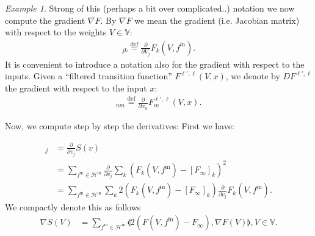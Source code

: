 \documentclass[10pt, a4paper]{article}
\theoremstyle{plain}
\theoremstyle{definition}
\theoremstyle{definition}
\theoremstyle{definition}
\theoremstyle{definition}
\theoremstyle{definition}
\theoremstyle{definition}
\theoremstyle{definition}
\theoremstyle{remark}
\theoremstyle{remark}
\newtheorem{example}[theorem]{Example}
\theoremstyle{rudin-style-generic}
\theoremstyle{rudin-style-generic*}
\theoremstyle{rudin-style-theorem}
\newcommand{\more}[1]{{{\noindent{}\hspace{-2cm}\color{red}{{$\blacktriangleright[[${{#1}}$]]$}}}}}
\newcommand{\deq}{\stackrel{\mathrm{def}}{=}}
\newcommand*{\fin}{{f^{\text{in}}}}
\begin{document}
\begin{example}
  Strong of this (perhaps a bit over complicated..) notation we now compute the gradient $\nabla F$.
  By $\nabla F$ we mean the gradient (i.e. Jacobian matrix) with respect to the weights $V\in\mathbb V$:
  \begin{align*}
    [\nabla F (V, \fin) ]_{jk} \deq \frac{\partial}{\partial V_j} F_k( V,\fin)
    .
  \end{align*}
  It is convenient to introduce a notation also for the gradient with respect to the inputs.
  Given a ``filtered transition function'' $F^{\ell',\ell}(V,x)$, we denote by $DF^{\ell',\ell}$
  the gradient with respect to the input $x$:
  \begin{align*}
    [DF^{\ell',\ell}(V,x)]_{nm} \deq \frac{\partial}{\partial x_n} F^{\ell',\ell}_m(V,x)
    .
  \end{align*}

  


  
  Now, we compute step by step the derivatives:
  First we have:

  \more{Note that there isn't a good notation for this.. one could write
    $\nabla \langle F(v)-F_\infty, F(v)-F_\infty \rangle = \langle 2(F(v)-F_\infty), \nabla F(v) \rangle$
    but this is not very good notation.. A correct notation would be:
    $ (\nabla f(x)){[h]} $ denotes the gradient in the direction $h$, then
    $\nabla (\langle F(x), F(x)\rangle){[h]} = \langle 2F(x), (\nabla F(x)){[h]}\rangle$.
  }
  
  \begin{align*}
    [\nabla S(v)]_j
    &= \frac{\partial}{\partial v_j} S(v) \\
    &= \sum_{\fin\in\mathcal H^{\text{in}}} \frac{\partial}{\partial v_j} \sum_k (F_k(V,\fin) - [F_\infty]_k  )^2 \\
    &= \sum_{\fin\in\mathcal H^{\text{in}}} \sum_k 2(F_k(V,\fin) - [F_\infty]_k)\frac{\partial}{\partial v_j} F_k(V,\fin)
    .
  \end{align*}
  We compactly denote this as follows
  \begin{align*}
    \nabla S(V)
    &= \sum_{\fin\in\mathcal H^{\text{in}}} \llangle 2(F(V,\fin) - F_\infty) , \nabla F(V) \rrangle,
      V\in\mathbb V
      .
  \end{align*}


\end{example}
\end{document}
